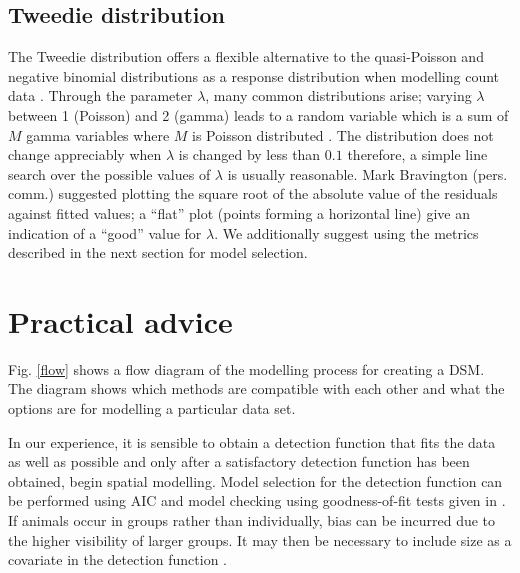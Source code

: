 \documentclass[a4paper,12pt]{article}
\begin{document}
\subsection*{Tweedie distribution}
\label{s:Tweedie}

The Tweedie distribution offers a flexible alternative to the quasi-Poisson and negative binomial distributions as a response distribution when modelling count data \citep{Candy:2004tb}. Through the parameter $\lambda$, many common distributions arise; varying $\lambda$ between 1 (Poisson) and 2 (gamma) leads to a random variable which is a sum of $M$ gamma variables where $M$ is Poisson distributed \citep{Jorgensen:1987vg}. The distribution does not change appreciably when $\lambda$ is changed by less than $0.1$ therefore, a simple line search over the possible values of $\lambda$ is usually reasonable. Mark Bravington (pers. comm.) suggested plotting the square root of the absolute value of the residuals against fitted values; a ``flat'' plot (points forming a horizontal line) give an indication of a ``good'' value for $\lambda$. We additionally suggest using the metrics described in the next section for model selection.


\section*{Practical advice}
\label{s:practical}

Fig. \ref{flow} shows a flow diagram of the modelling process for creating a DSM. The diagram shows which methods are compatible with each other and what the options are for modelling a particular data set.

In our experience, it is sensible to obtain a detection function that fits the data as well as possible and only after a satisfactory detection function has been obtained, begin spatial modelling. Model selection for the detection function can be performed using AIC and model checking using goodness-of-fit tests given in \cite[Section 11.11]{burnham:2004vd}.  If animals occur in groups rather than individually, bias can be incurred due to the higher visibility of larger groups. It may then be necessary to include size as a covariate in the detection function \citep[see][Section 4.8.2.4]{Buckland:2001vm}.
\end{document}
